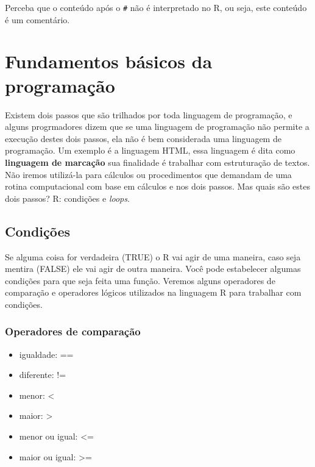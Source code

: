 \documentclass[
]{book}
\providecommand{\tightlist}{%
  \setlength{\itemsep}{0pt}\setlength{\parskip}{0pt}}
\theoremstyle{definition}
\theoremstyle{definition}
\theoremstyle{definition}
\theoremstyle{definition}
\theoremstyle{remark}
\begin{document}
Perceba que o conteúdo após o \texttt{\#} não é interpretado no R, ou seja, este conteúdo é um comentário.

\hypertarget{fundamentos-buxe1sicos-da-programauxe7uxe3o}{%
\chapter{Fundamentos básicos da programação}\label{fundamentos-buxe1sicos-da-programauxe7uxe3o}}

Existem dois passos que são trilhados por toda linguagem de programação, e alguns progrmadores dizem que se uma linguagem de programação não permite a execução destes dois passos, ela não é bem considerada uma linguagem de programação. Um exemplo é a linguagem HTML, essa linguagem é dita como \textbf{linguagem de marcação} sua finalidade é trabalhar com estruturação de textos. Não iremos utilizá-la para cálculos ou procedimentos que demandam de uma rotina computacional com base em cálculos e nos dois passos. Mas quais são estes dois passos? R: condições e \emph{loops}.

\hypertarget{condiuxe7uxf5es}{%
\section{Condições}\label{condiuxe7uxf5es}}

Se alguma coisa for verdadeira (TRUE) o R vai agir de uma maneira, caso seja mentira (FALSE) ele vai agir de outra maneira. Você pode estabelecer algumas condições para que seja feita uma função. Veremos alguns operadores de comparação e operadores lógicos utilizados na linguagem R para trabalhar com condições.

\hypertarget{operadores-de-comparauxe7uxe3o}{%
\subsection{Operadores de comparação}\label{operadores-de-comparauxe7uxe3o}}

\begin{itemize}
\tightlist
\item
  igualdade: ==
\item
  diferente: !=
\item
  menor: \textless{}
\item
  maior: \textgreater{}
\item
  menor ou igual: \textless=
\item
  maior ou igual: \textgreater=
\end{itemize}
\end{document}
